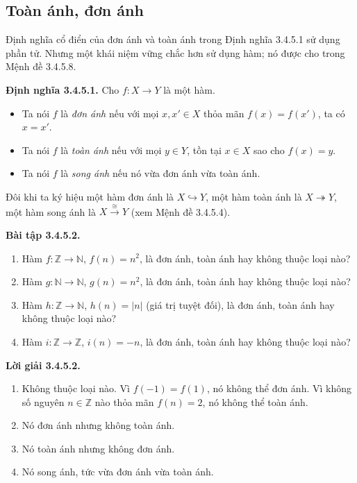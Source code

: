 \subsection{Toàn ánh, đơn ánh}
Định nghĩa cổ điển của đơn ánh và toàn ánh trong Định nghĩa 3.4.5.1 sử dụng phần tử. Nhưng một khái niệm vững chắc hơn sử dụng hàm; nó được cho trong Mệnh đề 3.4.5.8.

\noindent\textbf{Định nghĩa 3.4.5.1.} Cho $f:X\to Y$ là một hàm.
\begin{itemize}
\item Ta nói $f$ là \emph{đơn ánh} nếu với mọi $x,x'\in X$ thỏa mãn $f(x)=f(x')$, ta có $x=x'$.
\item Ta nói $f$ là \emph{toàn ánh} nếu với mọi $y\in Y$, tồn tại $x\in X$ sao cho $f(x)=y$.
\item Ta nói $f$ là \emph{song ánh} nếu nó vừa đơn ánh vừa toàn ánh.
\end{itemize}
Đôi khi ta ký hiệu một hàm đơn ánh là $X\hookrightarrow Y$, một hàm toàn ánh là $X\twoheadrightarrow Y$, một hàm song ánh là $X\xrightarrow{\cong}Y$ (xem Mệnh đề 3.4.5.4).

\noindent\textbf{Bài tập 3.4.5.2.}\keepwithnext
\begin{enumerate}[label=\alph*.]
\item Hàm $f:\mathbb Z\to\mathbb N$, $f(n)=n^2$, là đơn ánh, toàn ánh hay không thuộc loại nào?
\item Hàm $g:\mathbb N\to\mathbb N$, $g(n)=n^2$, là đơn ánh, toàn ánh hay không thuộc loại nào?
\item Hàm $h:\mathbb Z\to\mathbb N$, $h(n)=|n|$ (giá trị tuyệt đối), là đơn ánh, toàn ánh hay không thuộc loại nào?
\item Hàm $i:\mathbb Z\to\mathbb Z$, $i(n)=-n$, là đơn ánh, toàn ánh hay không thuộc loại nào?
\end{enumerate}
\noindent\textbf{Lời giải 3.4.5.2.}\keepwithnext
\begin{enumerate}[label=\alph*.]
\item Không thuộc loại nào. Vì $f(-1)=f(1)$, nó không thể đơn ánh. Vì không số nguyên $n\in\mathbb Z$ nào thỏa mãn $f(n)=2$, nó không thể toàn ánh.
\item Nó đơn ánh nhưng không toàn ánh.
\item Nó toàn ánh nhưng không đơn ánh.
\item Nó song ánh, tức vừa đơn ánh vừa toàn ánh.
\end{enumerate}

